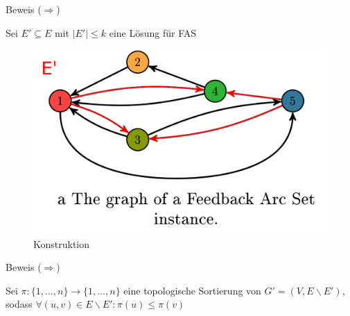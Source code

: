 \documentclass{beamer}
\begin{document}
\begin{frame}{Beweis (\glqq $\Rightarrow$\grqq)}
\begin{pointlist}
\item Sei $E'\subseteq E$ mit $|E'| \leq k$ eine Lösung für FAS
\end{pointlist}
\begin{figure}[ht]
		\includegraphics[width=.75\textwidth]{graphe}
		\caption{Konstruktion}
    \end{figure}
\end{frame}

\begin{frame}{Beweis (\glqq $\Rightarrow$\grqq)}
\begin{pointlist}
\item Sei $\pi:\{1,\dots,n\}\rightarrow \{1,\dots,n\}$ eine topologische Sortierung von $G'=(V, E\backslash E')$, sodass $\forall (u,v)\in E\backslash E': \pi(u)\leq \pi(v)$ 
\end{pointlist}
\begin{figure}
    \centering
\end{figure}
\end{frame}
\end{document}
